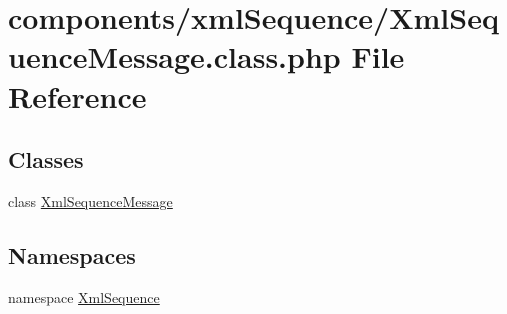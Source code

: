 \hypertarget{_xml_sequence_message_8class_8php}{
\section{components/xmlSequence/XmlSequenceMessage.class.php File Reference}
\label{_xml_sequence_message_8class_8php}
}
\subsection*{Classes}
\begin{CompactItemize}
\item 
class \hyperlink{class_xml_sequence_message}{XmlSequenceMessage}
\end{CompactItemize}
\subsection*{Namespaces}
\begin{CompactItemize}
\item 
namespace \hyperlink{namespace_xml_sequence}{XmlSequence}
\end{CompactItemize}
